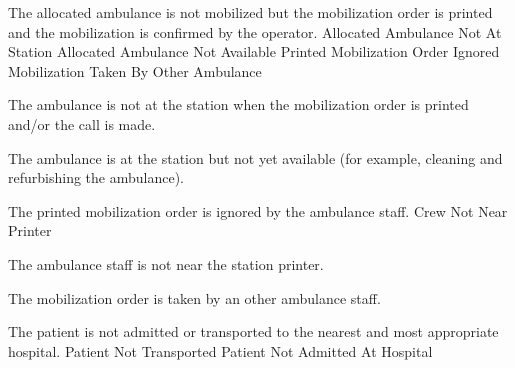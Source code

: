     {}
  
  \startkaosspec
  	 {The allocated ambulance is not mobilized but the mobilization order is printed and the mobilization is confirmed by the operator.}
  	 {Allocated Ambulance Not At Station}
  	 {Allocated Ambulance Not Available}
  	 {Printed Mobilization Order Ignored}
  	 {Mobilization Taken By Other Ambulance}
  \stopkaosspec
  
  \startkaosspec
  	 {The ambulance is not at the station when the mobilization order is printed and/or the call is made.}
  \stopkaosspec
  
  \startkaosspec
  	 {The ambulance is at the station but not yet available (for example, cleaning and refurbishing the ambulance).}
  \stopkaosspec
  
  \startkaosspec
  	 {The printed mobilization order is ignored by the ambulance staff.}
  	 {Crew Not Near Printer}
  \stopkaosspec
  
  \startkaosspec
  	 {The ambulance staff is not near the station printer.}
  \stopkaosspec
  
  \startkaosspec
  	 {The mobilization order is taken by an other ambulance staff.}
  \stopkaosspec
  
  
    {}
  
  \startkaosspec
  	 {The patient is not admitted or transported to the nearest and most appropriate hospital.}
  	 {Patient Not Transported}
  	 {Patient Not Admitted At Hospital}
  \stopkaosspec
  

